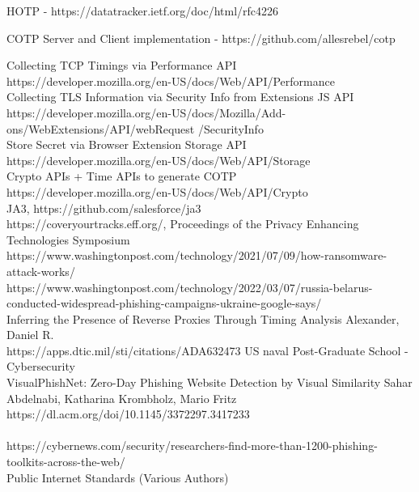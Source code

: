 \documentclass[a4paper, 11pt]{article} 				%
\begin{document}
\noindent
[8]HOTP - https://datatracker.ietf.org/doc/html/rfc4226 

\noindent
[9]COTP Server and Client implementation - https://github.com/allesrebel/cotp

\noindent
[10]Collecting TCP Timings via Performance API\\
https://developer.mozilla.org/en-US/docs/Web/API/Performance\\

\noindent
[11]Collecting TLS Information via Security Info from Extensions JS API\\
https://developer.mozilla.org/en-US/docs/Mozilla/Add-ons/WebExtensions/API/webRequest /SecurityInfo\\

\noindent
[12]Store Secret via Browser Extension Storage API\\
https://developer.mozilla.org/en-US/docs/Web/API/Storage\\

\noindent
[13]Crypto APIs + Time APIs to generate COTP\\
https://developer.mozilla.org/en-US/docs/Web/API/Crypto\\


\noindent
[14]JA3, https://github.com/salesforce/ja3\\

\noindent
[15]https://coveryourtracks.eff.org/, Proceedings of the Privacy Enhancing Technologies Symposium\\

\noindent
[16]https://www.washingtonpost.com/technology/2021/07/09/how-ransomware-attack-works/\\

\noindent
[17]https://www.washingtonpost.com/technology/2022/03/07/russia-belarus-conducted-widespread-phishing-campaigns-ukraine-google-says/\\

\noindent
[18]Inferring the Presence of Reverse Proxies Through Timing Analysis Alexander, Daniel R.\\
https://apps.dtic.mil/sti/citations/ADA632473 US naval Post-Graduate School - Cybersecurity\\

\noindent
[19]VisualPhishNet: Zero-Day Phishing Website Detection by Visual Similarity Sahar Abdelnabi, Katharina Krombholz, Mario Fritz\\
https://dl.acm.org/doi/10.1145/3372297.3417233\\

\\
https://cybernews.com/security/researchers-find-more-than-1200-phishing-toolkits-across-the-web/\\

\noindent
[-]Public Internet Standards (Various Authors)\\
\end{document}
